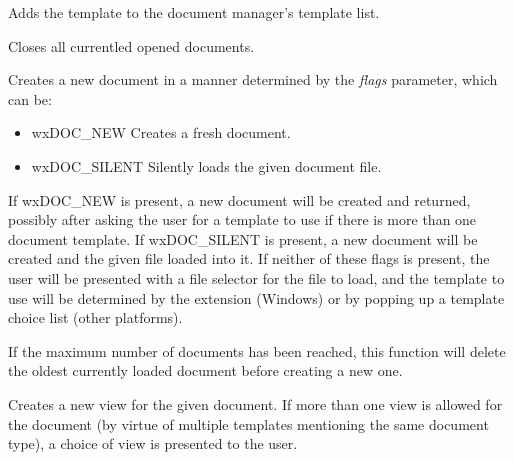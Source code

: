 

Adds the template to the document manager's template list.



Closes all currentled opened documents.



Creates a new document in a manner determined by the {\it flags} parameter, which can be:

\begin{itemize}\itemsep=0pt
\item wxDOC\_NEW Creates a fresh document.
\item wxDOC\_SILENT Silently loads the given document file.
\end{itemize}

If wxDOC\_NEW is present, a new document will be created and returned, possibly after
asking the user for a template to use if there is more than one document template.
If wxDOC\_SILENT is present, a new document will be created and the given file loaded
into it. If neither of these flags is present, the user will be presented with
a file selector for the file to load, and the template to use will be determined by the
extension (Windows) or by popping up a template choice list (other platforms).

If the maximum number of documents has been reached, this function
will delete the oldest currently loaded document before creating a new one.



Creates a new view for the given document. If more than one view is allowed for the
document (by virtue of multiple templates mentioning the same document type), a choice
of view is presented to the user.



